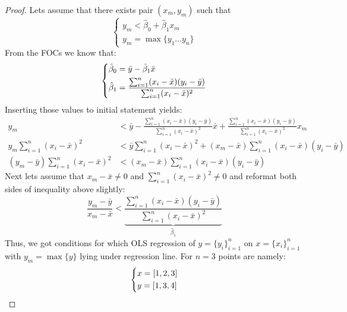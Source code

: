 \documentclass[12pt,reqno]{amsart}
\theoremstyle{plain}
\begin{document}
\begin{proof}
    Lets assume that there exists pair $ (x_{m}, y_{m}) $ such that
    \[
        \begin{cases}
            y_{m} < \hat{\beta}_{0} + \hat{\beta}_{1}x_{m} \\
            y_m = \max\{y_1 \dots y_n\}
        \end{cases}
    \]
    From the FOCs we know that:
    \[
        \begin{dcases}
            \hat{\beta}_{0} = \bar{y} - \hat{\beta}_{1} \bar{x} \\
            \hat{\beta}_{1} = \frac{\sum_{i=1}^{n} (x_i - \bar{x})(y_i - \bar{y})}{\sum_{i=1}^{n} (x_i - \bar{x})^2}
        \end{dcases}
    \]
    Inserting those values to initial statement yields:
    \begin{align*}
        y_{m}                                             & < \bar{y} - \frac{\sum_{i=1}^{n} (x_i - \bar{x})(y_i - \bar{y})}{\sum_{i=1}^{n} (x_i - \bar{x})^2} \bar{x}
        + \frac{\sum_{i=1}^{n} (x_i - \bar{x})(y_i - \bar{y})}{\sum_{i=1}^{n} (x_i - \bar{x})^2} x_{m}                                                                 \\
        y_{m}\sum_{i=1}^{n} (x_i - \bar{x})^2             & < \bar{y}\sum_{i=1}^{n} (x_i - \bar{x})^2 + (x_{m} - \bar{x})\sum_{i=1}^{n} (x_i - \bar{x})(y_i - \bar{y}) \\
        (y_{m} - \bar{y})\sum_{i=1}^{n} (x_i - \bar{x})^2 & <(x_{m} - \bar{x})\sum_{i=1}^{n} (x_i - \bar{x})(y_i - \bar{y})
    \end{align*}
    Next lets assume that $ x_{m} - \bar{x} \ne 0 $ and $ \sum_{i=1}^{n} (x_i - \bar{x})^2 \ne 0 $ and reformat both
    sides of inequality above slightly:
    \[
        \frac{y_{m} - \bar{y}}{x_{m} - \bar{x}} < \underbrace{\frac{\sum_{i=1}^{n} (x_i - \bar{x})(y_i - \bar{y})}{\sum_{i=1}^{n} (x_i - \bar{x})^2}}_{\hat{\beta}_1}
    \]
    Thus, we got conditions for which OLS regression of $ y = \{ y_i\}_{i=1}^{n} $ on $ x = \{x_i\}_{i=1}^{n} $
    with $ y_m = \max\{y\} $ lying under regression line. For $ n = 3 $ points are namely:
    \[
        \begin{dcases}
            x = [1, 2, 3] \\
            y = [1, 3, 4]
        \end{dcases}
    \]
\end{proof}
\end{document}
